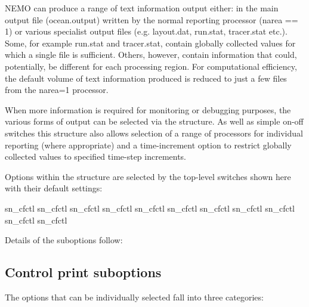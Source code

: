 \documentclass[../main/NEMO_manual]{subfiles}
\begin{document}
NEMO can produce a range of text information output either: in the main output
file (ocean.output) written by the normal reporting processor (narea == 1) or various
specialist output files (e.g. layout.dat, run.stat, tracer.stat etc.). Some, for example
run.stat and tracer.stat, contain globally collected values for which a single file is
sufficient. Others, however, contain information that could, potentially, be different
for each processing region. For computational efficiency, the default volume of text
information produced is reduced to just a few files from the narea=1 processor.

When more information is required for monitoring or debugging purposes, the various
forms of output can be selected via the  structure. As well as simple
on-off switches this structure also allows selection of a range of processors for
individual reporting (where appropriate) and a time-increment option to restrict
globally collected values to specified time-step increments.

Options within the structure are selected by the top-level switches shown here
with their default settings:

\begin{forlines}
   sn_cfctl%
   sn_cfctl%
   sn_cfctl%
   sn_cfctl%
   sn_cfctl%
   sn_cfctl%
   sn_cfctl%
   sn_cfctl%
   sn_cfctl%
   sn_cfctl%
   sn_cfctl%
\end{forlines}

Details of the suboptions follow: 

\subsection{Control print suboptions}

The options that can be individually selected fall into three categories:
\end{document}
